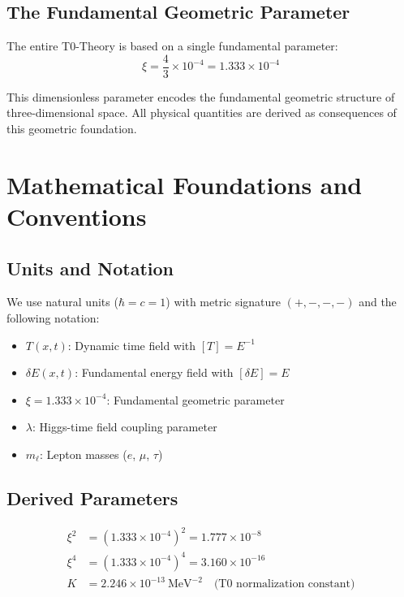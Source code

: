 \documentclass[12pt,a4paper]{article}
\begin{document}
	\subsection{The Fundamental Geometric Parameter}
	
	\begin{keyresult}
		The entire T0-Theory is based on a single fundamental parameter:
		\begin{equation}
			\boxed{\xi = \frac{4}{3} \times 10^{-4} = 1.333 \times 10^{-4}}
		\end{equation}
		
		This dimensionless parameter encodes the fundamental geometric structure of three-dimensional space. All physical quantities are derived as consequences of this geometric foundation.
	\end{keyresult}
	
	\section{Mathematical Foundations and Conventions}
	
	\subsection{Units and Notation}
	
	We use natural units ($\hbar = c = 1$) with metric signature $(+,-,-,-)$ and the following notation:
	
	\begin{itemize}
		\item $T(x,t)$: Dynamic time field with $[T] = E^{-1}$
		\item $\delta E(x,t)$: Fundamental energy field with $[\delta E] = E$
		\item $\xi = 1.333 \times 10^{-4}$: Fundamental geometric parameter
		\item $\lambda$: Higgs-time field coupling parameter
		\item $m_\ell$: Lepton masses ($e$, $\mu$, $\tau$)
	\end{itemize}
	
	\subsection{Derived Parameters}
	
	\begin{align}
		\xi^2 &= (1.333 \times 10^{-4})^2 = 1.777 \times 10^{-8} \\
		\xi^4 &= (1.333 \times 10^{-4})^4 = 3.160 \times 10^{-16} \\
		K &= 2.246 \times 10^{-13} \ \text{MeV}^{-2} \quad \text{(T0 normalization constant)}
	\end{align}
	
\end{document}
